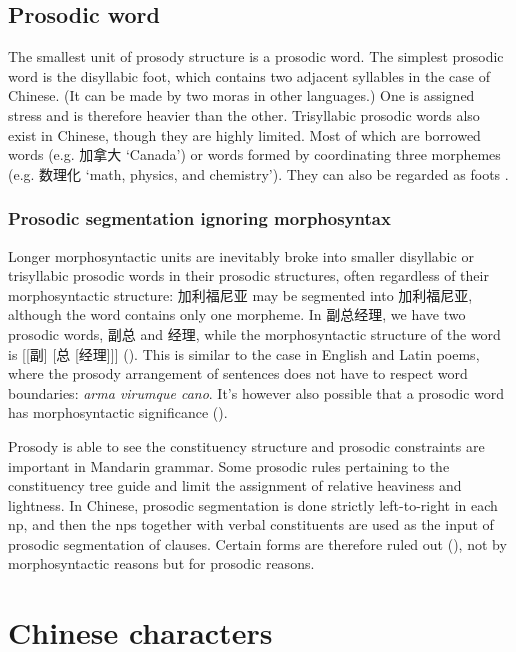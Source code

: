 \documentclass[UTF8, a4paper, oneside, scheme=plain, 12pt]{ctexrep}
\newcommand*{\citesec}[1]{\S~{#1}}
\newcommand{\form}[1]{\emph{#1}}
\newcommand{\translate}[1]{`#1'}
\begin{document}
\subsection{Prosodic word}

The smallest unit of prosody structure 
is a prosodic word.
The simplest prosodic word is the disyllabic foot, 
which contains two adjacent syllables in the case of Chinese.
(It can be made by two moras in other languages.)
One is assigned stress and is therefore heavier than the other.
Trisyllabic prosodic words also exist in Chinese,
though they are highly limited.
Most of which are borrowed words (e.g. 加拿大 \translate{Canada})
or words formed by coordinating three morphemes (e.g. 数理化 \translate{math, physics, and chemistry}).
They can also be regarded as foots \citep[\citesec{2.2}]{feng2000}.

\subsubsection{Prosodic segmentation ignoring morphosyntax}\label{sec:prosody.word.ignorance}

Longer morphosyntactic units are 
inevitably broke into smaller disyllabic or trisyllabic prosodic words
in their prosodic structures,
often regardless of their morphosyntactic structure:
加利福尼亚 may be segmented into 加利\textbar 福尼亚, 
although the word contains only one morpheme.
In 副总经理,
we have two prosodic words,
副总 and 经理,
while the morphosyntactic structure of the word is [[副] [总 [经理]]]
().
This is similar to the case in English and Latin poems,
where the prosody arrangement of sentences does not have to respect word boundaries:
\form{arma vi\textbar rumque ca\textbar no}.
It's however also possible that 
a prosodic word has morphosyntactic significance
().

Prosody is able to see the constituency structure
and prosodic constraints are important in Mandarin grammar.
Some prosodic rules pertaining to the constituency tree 
guide and limit the assignment of relative heaviness and lightness.
In Chinese, prosodic segmentation is done strictly left-to-right 
in each \ac{np},
and then the \ac{np}s together with verbal constituents 
are used as the input of prosodic segmentation of clauses.
Certain forms are therefore ruled out
(), 
not by morphosyntactic reasons but for prosodic reasons.

\section{Chinese characters}\label{sec:chinese-character}
\end{document}
